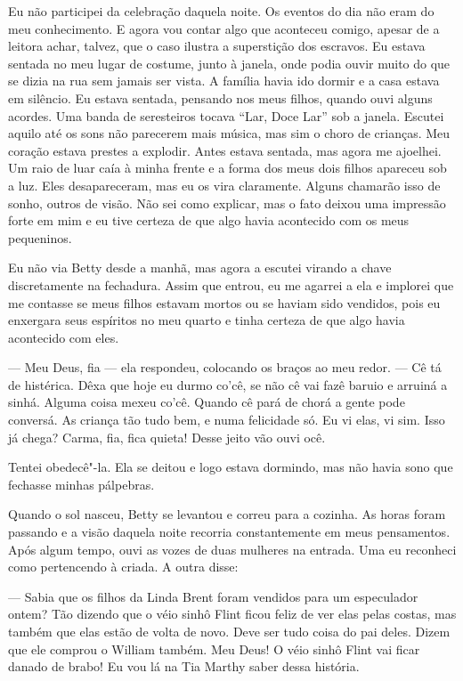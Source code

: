 Eu não participei da celebração daquela
noite. Os eventos do dia não eram do meu conhecimento. E agora vou
contar algo que aconteceu comigo, apesar de a leitora achar, talvez, que
o caso ilustra a superstição dos escravos. Eu estava sentada no meu
lugar de costume, junto à janela, onde podia ouvir muito do que se dizia
na rua sem jamais ser vista. A família havia ido dormir e a casa estava
em silêncio. Eu estava sentada, pensando nos meus filhos, quando ouvi
alguns acordes. Uma banda de seresteiros tocava ``Lar, Doce Lar'' sob a
janela. Escutei aquilo até os sons não parecerem mais música, mas sim o
choro de crianças. Meu coração estava prestes a explodir. Antes estava
sentada, mas agora me ajoelhei. Um raio de luar caía à minha frente e a
forma dos meus dois filhos apareceu sob a luz. Eles desapareceram, mas
eu os vira claramente. Alguns chamarão isso de sonho, outros de visão.
Não sei como explicar, mas o fato deixou uma impressão forte em mim e eu
tive certeza de que algo havia acontecido com os meus pequeninos.

Eu não via Betty desde a manhã, mas
agora a escutei virando a chave discretamente na fechadura. Assim que
entrou, eu me agarrei a ela e implorei que me contasse se meus filhos
estavam mortos ou se haviam sido vendidos, pois eu enxergara seus
espíritos no meu quarto e tinha certeza de que algo havia acontecido com
eles.

--- Meu Deus, fia --- ela respondeu, colocando os braços ao meu redor.
--- Cê tá de histérica. Dêxa que hoje eu durmo co'cê, se não cê vai fazê
baruio e arruiná a sinhá. Alguma coisa mexeu co'cê. Quando cê pará de
chorá a gente pode conversá. As criança tão tudo bem, e numa felicidade
só. Eu vi elas, vi sim. Isso já chega? Carma, fia, fica quieta! Desse
jeito vão ouvi ocê.

Tentei obedecê"-la. Ela se deitou e logo estava dormindo, mas não havia
sono que fechasse minhas pálpebras.

Quando o sol nasceu, Betty se levantou
e correu para a cozinha. As horas foram passando e a visão daquela noite
recorria constantemente em meus pensamentos. Após algum tempo, ouvi as
vozes de duas mulheres na entrada. Uma eu reconheci como pertencendo à
criada. A outra disse:

--- Sabia que os filhos da Linda Brent foram vendidos para um
especulador ontem? Tão dizendo que o véio sinhô Flint ficou feliz de ver
elas pelas costas, mas também que elas estão de volta de novo. Deve ser
tudo coisa do pai deles. Dizem que ele comprou o William também. Meu
Deus! O véio sinhô Flint vai ficar danado de brabo! Eu vou lá na Tia
Marthy saber dessa história.

